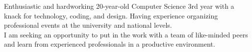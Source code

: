 \par{Enthusiastic and hardworking 20-year-old Computer Science 3rd year with a knack for technology, coding, and design. Having experience organizing professional events at the university and national levels.\\I am seeking an opportunity to put in the work with a team of like-minded peers and learn from experienced professionals in a productive environment.
}